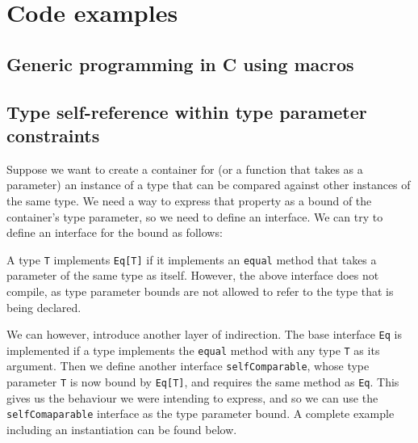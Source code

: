 \section{Code examples}

\subsection{Generic programming in C using macros}
\label{sec:generic-c}




\subsection{Type self-reference within type parameter constraints}
\label{sec:self-ref-type-in-bound}


Suppose we want to create a container for (or a function that takes as a
parameter) an instance of a type that can be compared against other instances of
the same type. We need a way to express that property as a bound of the
container's type parameter, so we need to define an interface. We can try to
define an interface for the bound as follows:

\noindent\begin{minipage}{\linewidth}
    
\end{minipage}

A type \texttt{T} implements \texttt{Eq[T]} if it implements an \texttt{equal}
method that takes a parameter of the same type as itself. However, the above
interface does not compile, as type parameter bounds are not allowed to refer to
the type that is being declared.

We can however, introduce another layer of indirection. The base interface
\texttt{Eq} is implemented if a type implements the \texttt{equal} method with
any type \texttt{T} as its argument. Then we define another interface
\texttt{selfComparable}, whose type parameter \texttt{T} is now bound by
\texttt{Eq[T]}, and requires the same method as \texttt{Eq}. This gives us the
behaviour we were intending to express, and so we can use the
\texttt{selfComaparable} interface as the type parameter bound. A complete
example including an instantiation can be found below.

